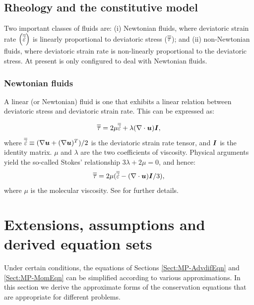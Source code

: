 \subsection{Rheology and the constitutive model}\label{Sect:Rheology}

Two important classes of fluids are: (i) Newtonian fluids, where deviatoric strain rate $\left(\overline{\overline{\dot{\varepsilon}}}\right)$ is linearly proportional to deviatoric stress ($\overline{\overline{\tau}}$); and (ii) non-Newtonian fluids, where deviatoric strain rate is non-linearly proportional to the deviatoric stress. At present \fluidity is only configured to deal with Newtonian fluids.

\subsubsection{Newtonian fluids}

A linear (or Newtonian) fluid is one that exhibits a linear relation between deviatoric stress and deviatoric strain rate. This can be expressed as: 

\begin{equation}
\overline{\overline{\tau}} = 2\mu \overline{\overline{\dot{\varepsilon}}} + \lambda(\nabla\cdot{\mbox{\boldmath$u$}}){\mbox{\boldmath$I$}},
\end{equation}
where $\overline{\overline{\dot{\varepsilon}}} \equiv(\nabla{\mbox{\boldmath$u$}} + (\nabla{\mbox{\boldmath$u$}})^T)/2$ is the
deviatoric strain rate tensor, and ${\mbox{\boldmath$I$}}$ is the identity matrix. $\mu$ and
$\lambda$ are the two coefficients of viscosity. Physical arguments
yield the so-called Stokes' relationship $3\lambda+2\mu=0$, and
hence:
\begin{equation}
\overline{\overline{\tau}} = 2\mu(\overline{\overline{\dot{\varepsilon}}} - (\nabla\cdot{\mbox{\boldmath$u$}}){\mbox{\boldmath$I$}}/3),
\end{equation}
where $\mu$ is the molecular viscosity. See \cite{batchelor1967} for further
details.

\section{Extensions, assumptions and derived equation sets}\label{sect:eqn_extensions}
Under certain conditions, the equations of Sections \ref{Sect:MP-AdvdifEqn} and \ref {Sect:MP-MomEqn} can be simplified according to various approximations. In this section we derive the approximate forms of the conservation equations that are appropriate for different problems. 


